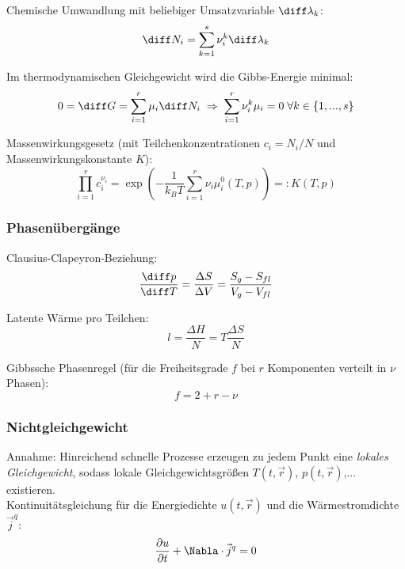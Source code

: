 \documentclass[11pt]{article}
\numberwithin{equation}{section}
\begin{document}
        Chemische Umwandlung mit beliebiger Umsatzvariable $\diff \lambda_k$:
        \begin{equation}
          \diff N_i = \sum_{k=1}^s \nu_i^k \diff \lambda_k
        \end{equation}

        Im thermodynamischen Gleichgewicht wird die Gibbs-Energie minimal:
        \begin{equation}
            0 = \diff G = \sum_{i=1}^r \mu_i \diff N_i \;\Rightarrow\; \sum_{i=1}^r \nu_i^k \mu_i = 0 \;\forall k\in\lbrace1,...,s\rbrace
        \end{equation}

        Massenwirkungsgesetz (mit Teilchenkonzentrationen $c_i = N_i/N$ und Massenwirkungskonstante $K$):
        \begin{equation}
          \prod_{i=1}^r  c_i^{\nu_i} = \exp\left( -\frac{1}{k_B T}\sum_{i=1}^r \nu_i\mu_i^0(T,p) \right) =: K(T,p)
        \end{equation}

      \subsubsection{Phasenübergänge}
        Clausius-Clapeyron-Beziehung:
        \begin{equation}
          \tder{p}{T} = \frac{\Delta S}{\Delta V} = \frac{S_g - S_{fl}}{V_g - V_{fl}}
        \end{equation}

        Latente Wärme pro Teilchen:
        \begin{equation}
          l = \frac{\Delta H}{N} = T\frac{\Delta S}{N}
        \end{equation}

        Gibbssche Phasenregel (für die Freiheitsgrade $f$ bei $r$ Komponenten verteilt in $\nu$ Phasen):
        \begin{equation}
          f = 2 + r - \nu
        \end{equation}

      \subsubsection{Nichtgleichgewicht}
        Annahme: Hinreichend schnelle Prozesse erzeugen zu jedem Punkt eine \emph{lokales Gleichgewicht}, sodass lokale Gleichgewichtsgrößen $T(t,\vec{r})$, $p(t,\vec{r})$,... existieren. \\
        Kontinuitätsgleichung für die Energiedichte $u(t,\vec{r})$ und die Wärmestromdichte $\vec{j}^q$:
        \begin{equation}
          \pder{u}{t} + \Nabla\cdot\vec{j}^q = 0
        \end{equation}
\end{document}
